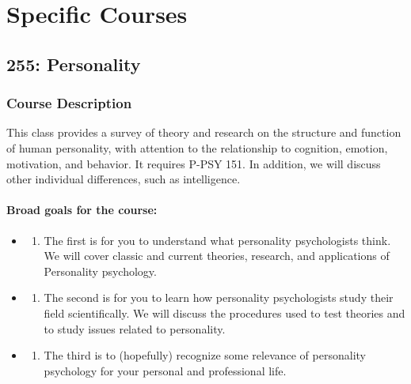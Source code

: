 \hypertarget{part-specific-courses}{%
\part*{Specific Courses}\label{part-specific-courses}}


\hypertarget{personality}{%
\chapter*{255: Personality}\label{personality}}


\hypertarget{course-description}{%
\section*{Course Description}\label{course-description}}


This class provides a survey of theory and research on the structure and function of human personality, with attention to the relationship to cognition, emotion, motivation, and behavior. It requires P-PSY 151. In addition, we will discuss other individual differences, such as intelligence.

\hypertarget{broad-goals-for-the-course}{%
\subsection*{Broad goals for the course:}\label{broad-goals-for-the-course}}


\begin{itemize}
\item
  \begin{enumerate}
  \def\labelenumi{\arabic{enumi}.}
  \tightlist
  \item
    The first is for you to understand what personality psychologists think. We will cover classic and current theories, research, and applications of Personality psychology.
  \end{enumerate}
\item
  \begin{enumerate}
  \def\labelenumi{\arabic{enumi}.}
  \setcounter{enumi}{1}
  \tightlist
  \item
    The second is for you to learn how personality psychologists study their field scientifically. We will discuss the procedures used to test theories and to study issues related to personality.
  \end{enumerate}
\item
  \begin{enumerate}
  \def\labelenumi{\arabic{enumi}.}
  \setcounter{enumi}{2}
  \tightlist
  \item
    The third is to (hopefully) recognize some relevance of personality psychology for your personal and professional life.
  \end{enumerate}
\end{itemize}

